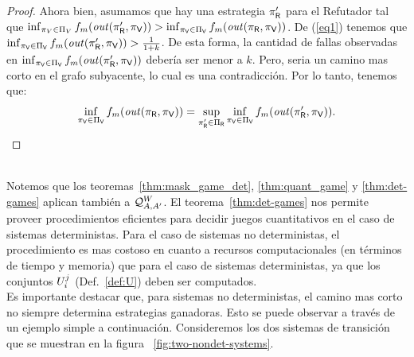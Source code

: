 \begin{proof}
Ahora bien, asumamos que hay una estrategia $\pi_{\mathsf{R}}'$ para el Refutador tal que 
$\inf_{\pi_V \in \Pi_V} f_m (\mathit{out}(\pi_{\mathsf{R}}', \pi_{\mathsf{V}})) > \inf_{\pi_{\mathsf{V}} \in \Pi_{\mathsf{V}}} f_m (\mathit{out}(\pi_{\mathsf{R}}, \pi_{\mathsf{V}}))$.
De (\ref{eq1}) tenemos que $\inf_{\pi_{\mathsf{V}} \in \Pi_{\mathsf{V}}} f_m(\mathit{out}(\pi_{\mathsf{R}}', \pi_{\mathsf{V}})) > \frac{1}{1+k}$. 
De esta forma, la cantidad de fallas observadas en 
$\inf_{\pi_{\mathsf{V}} \in \Pi_{\mathsf{V}}} f_m(\mathit{out}(\pi_{\mathsf{R}}', \pi_{\mathsf{V}}))$ debería ser menor a $k$. 
Pero, seria un camino mas corto en el grafo subyacente, lo cual es una contradicción. Por lo tanto, tenemos que:
\[	
	\inf_{\pi_{\mathsf{V}} \in \Pi_{\mathsf{V}}} f_m(\mathit{out}(\pi_{\mathsf{R}}, \pi_{\mathsf{V}})) = \sup_{\pi_{\mathsf{R}}' \in \Pi_{\mathsf{R}}} \inf_{\pi_{\mathsf{V}} \in \Pi_{\mathsf{V}}} f_m( \mathit{out}(\pi_{\mathsf{R}}',\pi_{\mathsf{V}})).
\]	
\qedhere
\end{proof} \\

Notemos que los teoremas~\ref{thm:mask_game_det}, \ref{thm:quant_game} y \ref{thm:det-games} aplican también a 
$\mathcal{Q}^W_{A,A'}$.
El teorema~\ref{thm:det-games} nos permite proveer procedimientos eficientes para decidir juegos cuantitativos en el caso de sistemas deterministas. Para el caso de sistemas no deterministas, el procedimiento es mas costoso en cuanto a recursos computacionales (en términos de tiempo y memoria) que para el caso de sistemas deterministas, ya que los conjuntos $U^j_i$ (Def.~\ref{def:U}) deben ser computados. \\

Es importante destacar que, para sistemas no deterministas, el camino mas corto no siempre determina estrategias ganadoras. Esto se puede observar a través de un ejemplo simple a continuación. Consideremos los dos sistemas de transición que se muestran en la figura ~\ref{fig:two-nondet-systems}.

